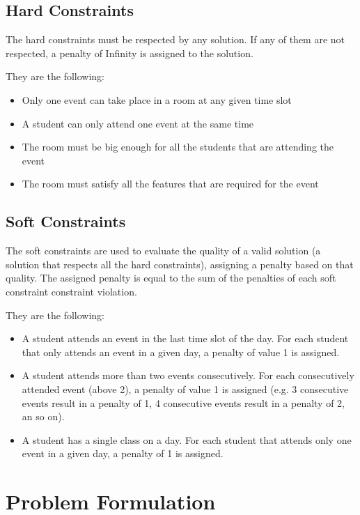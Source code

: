 \documentclass[conference]{IEEEtran}
\begin{document}
\subsection{Hard Constraints}

The hard constraints must be respected by any solution. If any of them are not respected, a penalty of Infinity is assigned to the solution.

They are the following:

\begin{itemize}
    \item Only one event can take place in a room at any given time slot
    \item A student can only attend one event at the same time
    \item The room must be big enough for all the students that are attending the event
    \item The room must satisfy all the features that are required for the event
\end{itemize}

\subsection{Soft Constraints}

The soft constraints are used to evaluate the quality of a valid solution (a solution that respects all the hard constraints), assigning a penalty based on that quality. The assigned penalty is equal to the sum of the penalties of each soft constraint constraint violation.

They are the following: 

\begin{itemize}
    \item A student attends an event in the last time slot of the day. For each student that only attends an event in a given day, a penalty of value 1 is assigned.
    \item A student attends more than two events consecutively. For each consecutively attended event (above 2), a penalty of value 1 is assigned (e.g. 3 consecutive events result in a penalty of 1, 4 consecutive events result in a penalty of 2, an so on). 
    \item A student has a single class on a day. For each student that attends only one event in a given day, a penalty of 1 is assigned.
\end{itemize}

\section{Problem Formulation}
\end{document}
